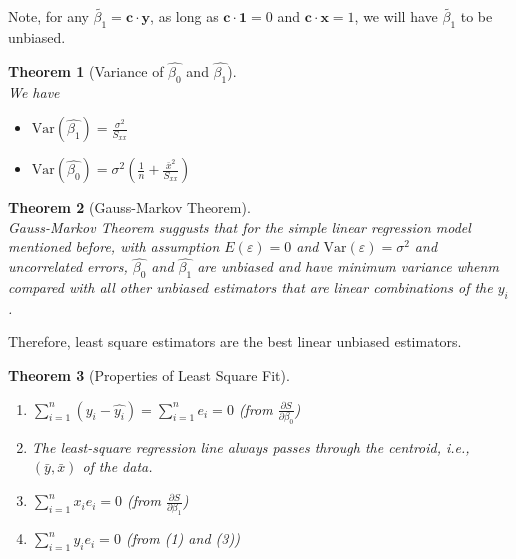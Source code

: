 \documentclass[12pt]{article}
\newcommand{\var}{\mathrm{Var}}
\newtheorem{theorem}{Theorem}[section]
\theoremstyle{definition}
\begin{document}
Note, for any $\tilde{\beta_1}= \mathbf{c}\cdot\mathbf{y}$, as long as $\mathbf{c}\cdot \mathbf{1} = 0$ and $\mathbf{c}\cdot \mathbf{x} = 1$, we will have $\tilde{\beta_1}$ to be unbiased.
\begin{theorem}[Variance of {$\hat{\beta_0}$} and {$\hat{\beta_1}$}]
\hfill\\\normalfont 
We have
\begin{itemize}
  \item $\var(\hat{\beta_1}) = \frac{\sigma^2}{S_{xx}}$
  \item $\var(\hat{\beta_0}) = \sigma^2\left(\frac{1}{n}+\frac{\bar{x}^2}{S_{xx}}\right)$
\end{itemize}
\end{theorem}
\begin{theorem}[Gauss-Markov Theorem]
\hfill\\\normalfont Gauss-Markov Theorem suggusts that for the simple linear regression model mentioned before, with assumption $E(\varepsilon) = 0$ and $\var(\varepsilon) = \sigma^2$ and uncorrelated errors, $\hat{\beta_0}$ and $\hat{\beta_1}$ are unbiased and have minimum variance whenm compared with all other unbiased estimators that are linear combinations of the $y_i$.
\end{theorem}
Therefore, least square estimators are the best linear unbiased estimators.
\begin{theorem}[Properties of Least Square Fit]
\hfill\\\normalfont \begin{enumerate}
\item $\sum_{i=1}^n (y_i-\hat{y_i}) =\sum_{i=1}^n e_i = 0$ (from $\frac{\partial S}{\partial \beta_0}$)
\item The least-square regression line always passes through the centroid, i.e., $(\bar{y}, \bar{x})$ of the data.
\item $\sum_{i=1}^n x_ie_i = 0$ (from $\frac{\partial S}{\partial \beta_1}$)
\item $\sum_{i=1}^n \hat{y_i}e_i = 0$ (from (1) and (3))
\end{enumerate}
\end{theorem}
\end{document}
